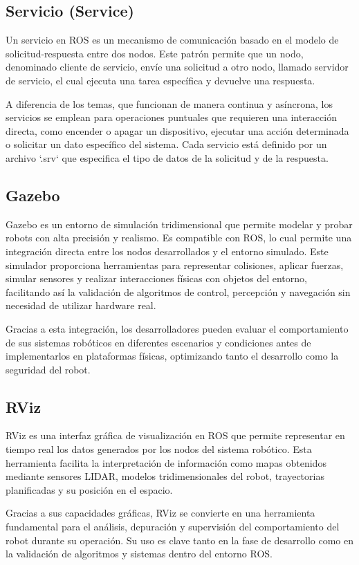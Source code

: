 \subsection{Servicio (Service)}

Un servicio en ROS es un mecanismo de comunicación basado en el modelo de solicitud-respuesta entre dos nodos. Este patrón permite que un nodo, denominado cliente de servicio, envíe una solicitud a otro nodo, llamado servidor de servicio, el cual ejecuta una tarea específica y devuelve una respuesta.

A diferencia de los temas, que funcionan de manera continua y asíncrona, los servicios se emplean para operaciones puntuales que requieren una interacción directa, como encender o apagar un dispositivo, ejecutar una acción determinada o solicitar un dato específico del sistema. Cada servicio está definido por un archivo `.srv` que especifica el tipo de datos de la solicitud y de la respuesta.

\subsection{Gazebo}

Gazebo es un entorno de simulación tridimensional que permite modelar y probar robots con alta precisión y realismo. Es compatible con ROS, lo cual permite una integración directa entre los nodos desarrollados y el entorno simulado. Este simulador proporciona herramientas para representar colisiones, aplicar fuerzas, simular sensores y realizar interacciones físicas con objetos del entorno, facilitando así la validación de algoritmos de control, percepción y navegación sin necesidad de utilizar hardware real.

Gracias a esta integración, los desarrolladores pueden evaluar el comportamiento de sus sistemas robóticos en diferentes escenarios y condiciones antes de implementarlos en plataformas físicas, optimizando tanto el desarrollo como la seguridad del robot.

\subsection{RViz}

RViz es una interfaz gráfica de visualización en ROS que permite representar en tiempo real los datos generados por los nodos del sistema robótico. Esta herramienta facilita la interpretación de información como mapas obtenidos mediante sensores LIDAR, modelos tridimensionales del robot, trayectorias planificadas y su posición en el espacio.

Gracias a sus capacidades gráficas, RViz se convierte en una herramienta fundamental para el análisis, depuración y supervisión del comportamiento del robot durante su operación. Su uso es clave tanto en la fase de desarrollo como en la validación de algoritmos y sistemas dentro del entorno ROS.
